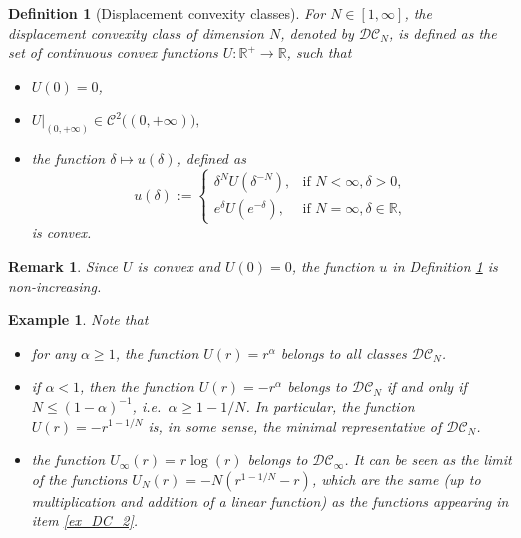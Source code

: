 \documentclass[10pt,a4paper]{amsart}
\newtheorem{Def}{Definition}
\newtheorem{rem}{Remark}
\newtheorem{exmp}{Example}
\begin{document}
		\begin{Def}[Displacement convexity classes]\label{def:DCN}
			For $N\in[1,\infty]$, the displacement convexity class of dimension $N$, denoted by $\mathcal{DC}_N$, is defined as the set of continuous convex functions $U:\mathbb{R}^{+}\to\mathbb{R}$, such that 
			\begin{itemize}
				\item $U(0)=0$,
				\item $U|_{(0,+\infty)}\in\mathcal{C}^2\big((0,+\infty)\big),$
				\item the function $\delta\mapsto u(\delta)$, defined as
			 	\begin{equation}
			 		u(\delta):=\begin{cases}
			 			\delta^NU(\delta^{-N}), &\text{if }N<\infty,\delta>0,\\
			 			e^{\delta}U(e^{-\delta}), &\text{if }N=\infty,\delta\in\mathbb{R},
			 			\end{cases}
			 	\end{equation}
                is convex.
			\end{itemize}
		\end{Def}
		\begin{rem}\label{nonincreasing_u}
			Since $U$ is convex and $U(0)=0$, the function $u$ in Definition \ref{def:DCN} is  non-increasing.
		\end{rem}
		\begin{exmp}
			Note that 
			\begin{itemize}
				\item for any $\alpha\geq 1$, the function $U(r)=r^{\alpha}$ belongs to all classes $\mathcal{DC}_N$.
				\item \label{ex_DC_2} if $\alpha<1$, then the function $U(r)=-r^{\alpha}$ belongs to $\mathcal{DC}_N$ if and only if $N\leq (1-\alpha)^{-1}$, i.e.\ $\alpha\geq 1-1/N$. In particular, the function $U(r)=-r^{1-1/N}$ is, in some sense, the minimal representative of $\mathcal{DC}_N$.
				\item the function $U_{\infty}(r)=r\log(r)$ belongs to $\mathcal{DC}_{\infty}$. It can be seen as the limit of the functions $U_N(r)=-N(r^{1-1/N}-r)$, which are the same (up to multiplication and addition of a linear function) as the functions appearing in item \eqref{ex_DC_2}. 
			\end{itemize}
		\end{exmp}
\end{document}
